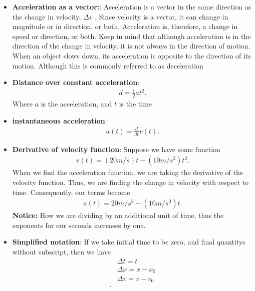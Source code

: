 \documentclass{report}
\begin{document}
\begin{itemize}
               \item \textbf{Acceleration as a vector:}: Acceleration is a vector in the same direction as the change in velocity,  $\Delta v$ . Since velocity is a vector, it can change in magnitude or in direction, or both. Acceleration is, therefore, a change in speed or direction, or both.
         \bigbreak \noindent 
         Keep in mind that although acceleration is in the direction of the change in velocity, it is not always in the direction of motion. When an object slows down, its acceleration is opposite to the direction of its motion. Although this is commonly referred to as deceleration
        \item \textbf{Distance over constant acceleration}:
            \begin{align*}
                d = \frac{1}{2}at^{2} 
            .\end{align*}
            Where $a$ is the acceleration, and $t$ is the time
        \item \textbf{instantaneous acceleration}:
            \begin{align*}
            a(t) = \frac{d}{dt}v(t)
            .\end{align*}
        \item \textbf{Derivative of velocity function}: Suppose we have some function 
            \begin{align*}
                v(t) = (20 m/s) t - (10 m/s^{2})t^{2}
            .\end{align*}
            When we find the acceleration function, we are taking the derivative of the velocity function. Thus, we are finding the change in velocity with respect to time. Consequently, our terms become
            \begin{align*}
                a(t) = 20 m/s^{2} - (10m/s^{3})t
            .\end{align*}
            \textbf{Notice:} How we are dividing by an additional unit of time, thus the exponents for our seconds increases by one.
        \item \textbf{Simplified notation}: If we take initial time to be zero, and final quantitys without subscript, then we have 
            \begin{align*}
               &\Delta t = t\\
                &\Delta x = x - x_{0}\\
                &\Delta v = v- v_{0}\\
            .\end{align*}

\end{itemize}
\end{document}
